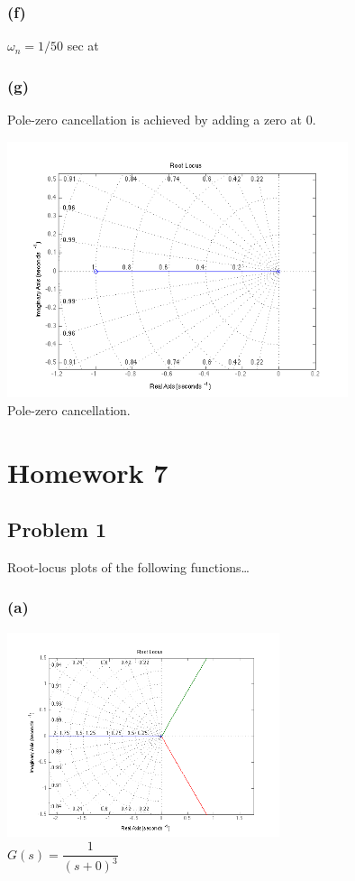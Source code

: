 \documentclass[letterpaper,10pt]{article}
\begin{document}
\subsubsection*{(f)}
$\omega_{n}=1/50$ sec at 
\subsubsection*{(g)}
Pole-zero cancellation is achieved by adding a zero at 0.
\begin{center}
	\includegraphics[width=0.75\textwidth]{homework04-6-2g.png} \\
	Pole-zero cancellation.
\end{center}

\section*{Homework 7}
\subsection*{Problem 1}
Root-locus plots of the following functions\dots
\subsubsection*{(a)}
\begin{center}
    \includegraphics[width=0.6\textwidth]{homework04-7-1-a.png} \\
   $G(s) = \dfrac{1}{(s+0)^{3}}$
\end{center}
\end{document}
